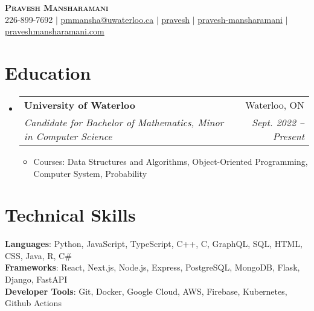 \documentclass[letterpaper,11pt]{article}
\makeatletter
\newcommand{\resumeItem}[1]{
  \item\small{
    {#1 \vspace{-2pt}}
  }
}
\newcommand{\resumeSubheading}[4]{
  \vspace{-2pt}\item
    \begin{tabular*}{0.97\textwidth}[t]{l@{\extracolsep{\fill}}r}
      \textbf{#1} & #2 \\
      \textit{\small#3} & \textit{\small #4} \\
    \end{tabular*}\vspace{-7pt}
}
\newcommand{\resumeSubHeadingListStart}{\begin{itemize}[leftmargin=0.15in, label={}]}
\newcommand{\resumeSubHeadingListEnd}{\end{itemize}}
\newcommand{\resumeItemListStart}{\begin{itemize}}
\newcommand{\resumeItemListEnd}{\end{itemize}\vspace{-5pt}}
\makeatother
\begin{document}

\begin{center}
    \textbf{\Huge \scshape Pravesh Mansharamani} \\ \vspace{1pt}
    \small \faPhone \text{} 226-899-7692 $|$ \href{mailto:x@x.com}{\faEnvelope \text{} {pmmansha@uwaterloo.ca}} $|$ 
    \faLinkedin\href{https://www.linkedin.com/in/pravesh-mansharamani-924984198/}{ {pravesh}} $|$
    \faGithub\href{https://github.com/Pravesh-mansharamani/}{ {pravesh-mansharamani}} $|$ \faGlobe\href{https://pravesh-mansharamani.vercel.app/}{ {praveshmansharamani.com}}
\end{center}


\section{Education}
  \resumeSubHeadingListStart
    \resumeSubheading
      {University of Waterloo}{Waterloo, ON}
      {Candidate for Bachelor of Mathematics, Minor in Computer Science}{Sept. 2022 -- Present}
      \resumeItemListStart
      \resumeItem{Courses: Data Structures and Algorithms, Object-Oriented Programming, Computer System, Probability}
      \resumeItemListEnd
  \resumeSubHeadingListEnd


\section{Technical Skills}
 \begin{itemize}[leftmargin=0.15in, label={}]
    \small{\item{
     \textbf{Languages}{: Python, JavaScript, TypeScript, C++, C, GraphQL, SQL, HTML, CSS, Java, R, C\# } \\
     \textbf{Frameworks}{: React, Next.js, Node.js, Express, PostgreSQL, MongoDB, Flask, Django, FastAPI} \\
     \textbf{Developer Tools}{: Git, Docker, Google Cloud, AWS, Firebase, Kubernetes, Github Actions} \\
    }}
 \end{itemize}
\end{document}
